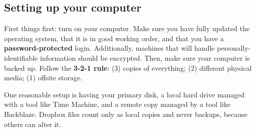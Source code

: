 \subsection{Setting up your computer}

First things first: turn on your computer.
Make sure you have fully updated the operating system,
that it is in good working order,
and that you have a \textbf{password-protected} login. Additionally, machines that will handle personally-identifiable information should be encrypted.
Then, make sure your computer is backed up.
Follow the \textbf{3-2-1 rule}:
(3) copies of everything;
(2) different physical media;
(1) offsite storage.

One reasonable setup is having your primary disk,
a local hard drive managed with a tool like Time Machine,
and a remote copy managed by a tool like Backblaze.
Dropbox files count only as local copies and never backups,
because others can alter it.


